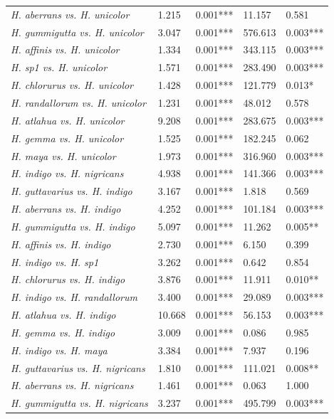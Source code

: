 \begin{xltabular}{\textwidth}{p{4.5cm}*{4}{X}}
\emph{H. aberrans vs. H. unicolor} & 1.215 & 0.001*** & 11.157 & 0.581 \\
\emph{H. gummigutta vs. H. unicolor} & 3.047 & 0.001*** & 576.613 & 0.003*** \\
\emph{H. affinis vs. H. unicolor} & 1.334 & 0.001*** & 343.115 & 0.003*** \\
\emph{H. sp1 vs. H. unicolor} & 1.571 & 0.001*** & 283.490 & 0.003*** \\
\emph{H. chlorurus vs. H. unicolor} & 1.428 & 0.001*** & 121.779 & 0.013* \\
\emph{H. randallorum vs. H. unicolor} & 1.231 & 0.001*** & 48.012 & 0.578 \\
\emph{H. atlahua vs. H. unicolor} & 9.208 & 0.001*** & 283.675 & 0.003*** \\
\emph{H. gemma vs. H. unicolor} & 1.525 & 0.001*** & 182.245 & 0.062 \\
\emph{H. maya vs. H. unicolor} & 1.973 & 0.001*** & 316.960 & 0.003*** \\
\emph{H. indigo vs. H. nigricans} & 4.938 & 0.001*** & 141.366 & 0.003*** \\
\emph{H. guttavarius vs. H. indigo} & 3.167 & 0.001*** & 1.818 & 0.569 \\
\emph{H. aberrans vs. H. indigo} & 4.252 & 0.001*** & 101.184 & 0.003*** \\
\emph{H. gummigutta vs. H. indigo} & 5.097 & 0.001*** & 11.262 & 0.005** \\
\emph{H. affinis vs. H. indigo} & 2.730 & 0.001*** & 6.150 & 0.399 \\
\emph{H. indigo vs. H. sp1} & 3.262 & 0.001*** & 0.642 & 0.854 \\
\emph{H. chlorurus vs. H. indigo} & 3.876 & 0.001*** & 11.911 & 0.010** \\
\emph{H. indigo vs. H. randallorum} & 3.400 & 0.001*** & 29.089 & 0.003*** \\
\emph{H. atlahua vs. H. indigo} & 10.668 & 0.001*** & 56.153 & 0.003*** \\
\emph{H. gemma vs. H. indigo} & 3.009 & 0.001*** & 0.086 & 0.985 \\
\emph{H. indigo vs. H. maya} & 3.384 & 0.001*** & 7.937 & 0.196 \\
\emph{H. guttavarius vs. H. nigricans} & 1.810 & 0.001*** & 111.021 & 0.008** \\
\emph{H. aberrans vs. H. nigricans} & 1.461 & 0.001*** & 0.063 & 1.000 \\
\emph{H. gummigutta vs. H. nigricans} & 3.237 & 0.001*** & 495.799 & 0.003*** \\

\end{xltabular}
